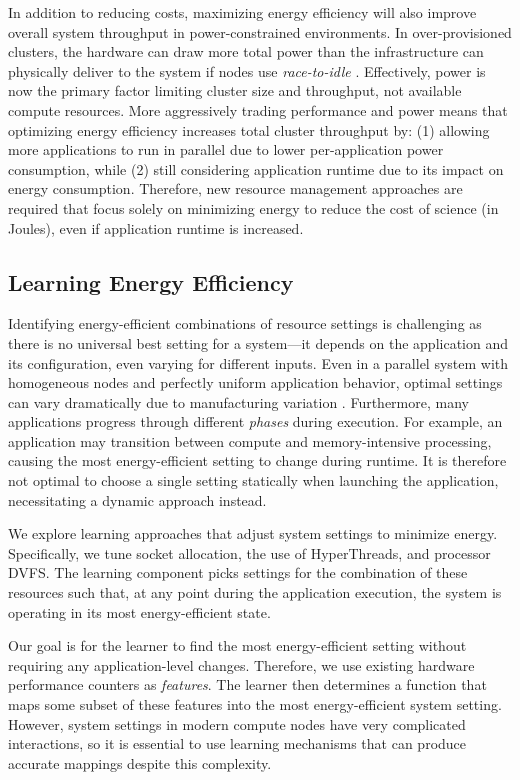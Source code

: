 In addition to reducing costs, maximizing energy efficiency will also improve overall system throughput in power-constrained environments.
In over-provisioned clusters, the hardware can draw more total power than the infrastructure can physically deliver to the system if nodes use \emph{race-to-idle} \cite{Sarood2013}.
Effectively, power is now the primary factor limiting cluster size and throughput, not available compute resources.
More aggressively trading performance and power means that optimizing energy efficiency increases total cluster throughput by: (1) allowing more applications to run in parallel due to lower per-application power consumption, while (2) still considering application runtime due to its impact on energy consumption.
Therefore, new resource management approaches are required that focus solely on minimizing energy to reduce the cost of science (in Joules), even if application runtime is increased.


\subsection{Learning Energy Efficiency}
\label{sec:challenges-learning}

Identifying energy-efficient combinations of resource settings is challenging as there is no universal best setting for a system---it depends on the application and its configuration, even varying for different inputs.
Even in a parallel system with homogeneous nodes and perfectly uniform application behavior, optimal settings can vary dramatically due to manufacturing variation \cite{Acun2016}.
Furthermore, many applications progress through different \emph{phases} during execution.
For example, an application may transition between compute and memory-intensive processing, causing the most energy-efficient setting to change during runtime.
It is therefore not optimal to choose a single setting statically when launching the application, necessitating a dynamic approach instead.

We explore learning approaches that adjust system settings to minimize energy.
Specifically, we tune socket allocation, the use of HyperThreads, and processor DVFS.
The learning component picks settings for the combination of these resources such that, at any point during the application execution, the system is operating in its most energy-efficient state.

Our goal is for the learner to find the most energy-efficient setting without requiring any application-level changes.
Therefore, we use existing hardware performance counters as \emph{features}.
The learner then determines a function that maps some subset of these features into the most energy-efficient system setting.
However, system settings in modern compute nodes have very complicated interactions, so it is essential to use learning mechanisms that can produce accurate mappings despite this complexity.

